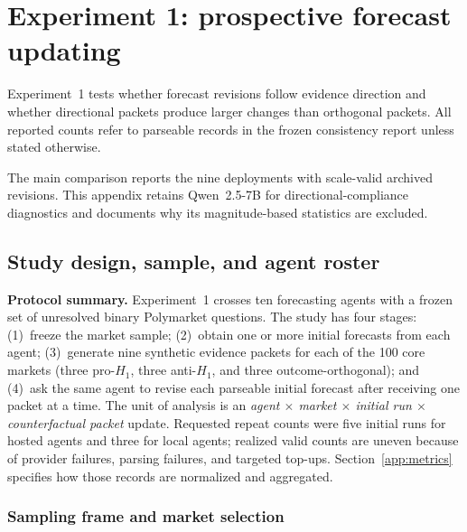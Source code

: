 
\section{Experiment 1: prospective forecast updating}
\label{app:exp1}

Experiment~1 tests whether
forecast revisions follow evidence direction and whether directional packets
produce larger changes than orthogonal packets.
All reported counts refer to parseable records in the frozen consistency report
unless stated otherwise.

The main comparison reports the nine deployments with scale-valid archived
revisions. This appendix retains Qwen~2.5-7B for directional-compliance diagnostics
and documents why its magnitude-based statistics are excluded.

\subsection{Study design, sample, and agent roster}
\label{app:exp1-sample}

\noindent\textbf{Protocol summary.}
Experiment~1 crosses ten forecasting agents with a frozen set of unresolved binary
Polymarket questions.  The study has four stages: (1)~freeze the market sample;
(2)~obtain one or more initial forecasts from each agent; (3)~generate nine synthetic
evidence packets for each of the 100 core markets (three pro-$H_1$, three
anti-$H_1$, and three outcome-orthogonal); and (4)~ask the same agent to revise each
parseable initial forecast after receiving one packet at a time.  The unit of analysis is an \emph{agent $\times$ market $\times$ initial run
$\times$ counterfactual packet} update.  Requested repeat
counts were five initial runs for hosted agents and three for local agents; realized
valid counts are uneven because of provider failures, parsing failures, and targeted
top-ups.  Section~\ref{app:metrics} specifies how those records are normalized and
aggregated.

\subsubsection{Sampling frame and market selection}
\label{app:market-selection}

